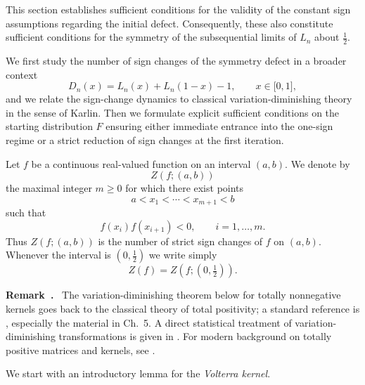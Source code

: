\documentclass[onecolumn]{article}
\newtheorem{definition}[theorem]{Definition}
\let\olddefinition\definition
\let\endolddefinition\enddefinition
\renewenvironment{definition}{\olddefinition\normalfont}{\endolddefinition}
\newenvironment{remark}{  \refstepcounter{theorem}  \par\medskip\noindent\textbf{Remark~\thetheorem.}\rmfamily\ }{\par\medskip}
\begin{document}
This section establishes sufficient conditions for the validity of the
constant sign assumptions regarding the initial defect. Consequently, these
also constitute sufficient conditions for the symmetry of the subsequential
limits of $L_{n}$ about $\frac{1}{2}$.

We first study the number of sign changes of the symmetry defect in a
broader context 
\begin{equation}
D_{n}(x)=L_{n}(x)+L_{n}(1-x)-1,\qquad x\in \lbrack 0,1],  \label{1315}
\end{equation}%
and we relate the sign-change dynamics to classical variation-diminishing
theory in the sense of Karlin. Then we formulate explicit sufficient
conditions on the starting distribution $F$ ensuring either immediate
entrance into the one-sign regime or a strict reduction of sign changes at
the first iteration.

\begin{definition}
\label{Z-signchanges} Let $f$ be a continuous real-valued function on an
interval $(a,b)$. We denote by 
\begin{equation}
Z(f;(a,b))  \label{1316}
\end{equation}%
the maximal integer $m\geq 0$ for which there exist points 
\begin{equation}
a<x_{1}<\cdots <x_{m+1}<b  \label{1317}
\end{equation}%
such that 
\begin{equation}
f(x_{i})f(x_{i+1})<0,\qquad i=1,\dots ,m.  \label{1318}
\end{equation}%
Thus $Z(f;(a,b))$ is the number of strict sign changes of $f$ on $(a,b)$.
Whenever the interval is $(0,\tfrac{1}{2})$ we write simply 
\begin{equation}
Z(f)=Z\!\left( f;\left( 0,\tfrac{1}{2}\right) \right) .  \label{1319}
\end{equation}
\end{definition}

\begin{remark}
\label{bibliographic-VD} The variation-diminishing theorem below for totally
nonnegative kernels goes back to the classical theory of total positivity; a
standard reference is \cite{[36]}, especially the material in Ch.~5. A
direct statistical treatment of variation-diminishing transformations is
given in \cite{[64]}. For modern background on totally positive matrices and
kernels, see \cite{[65]}.
\end{remark}

We start with an introductory lemma for the \textit{Volterra kernel}.
\end{document}

